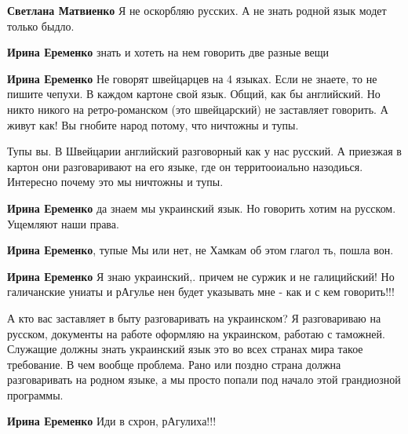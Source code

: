 \begin{itemize}
\begin{itemize}
\textbf{Светлана Матвиенко} Я не оскорбляю русских. А не знать родной язык модет только быдло.

\textbf{Ирина Еременко} знать и хотеть на нем говорить две разные вещи

\textbf{Ирина Еременко} Не говорят швейцарцев на 4 языках. Если не знаете, то не
пишите чепухи. В каждом картоне свой язык. Общий, как бы английский. Но никто
никого на ретро-романском (это швейцарский) не заставляет говорить. А живут
как! Вы гнобите народ потому, что ничтожны и тупы.

Тупы вы. В Швейцарии английский разговорный как у нас русский. А приезжая в
картон они разговаривают на его языке, где он территооиально назодиься.
Интересно почему это мы ничтожны и тупы.

\textbf{Ирина Еременко} да знаем мы украинский язык. Но говорить хотим на русском. Ущемляют наши права.

\textbf{Ирина Еременко}, тупые Мы или нет, не Хамкам об этом глагол ть, пошла вон.

\textbf{Ирина Еременко} Я знаю украинский,. причем не суржик и не галицийский!
Но галичанские униаты и рАгулье нен будет указывать мне - как и с кем
говорить!!!


А кто вас заставляет в быту разговаривать на украинском? Я разговариваю на
русском, документы на работе оформляю на украинском, работаю с таможней.
Служащие должны знать украинский язык это во всех странах мира такое
требование. В чем вообще проблема. Рано или поздно страна должна разговаривать
на родном языке, а мы просто попали под начало этой грандиозной программы.


\textbf{Ирина Еременко} Иди в схрон, рАгулиха!!!


\end{itemize}
\end{itemize}
